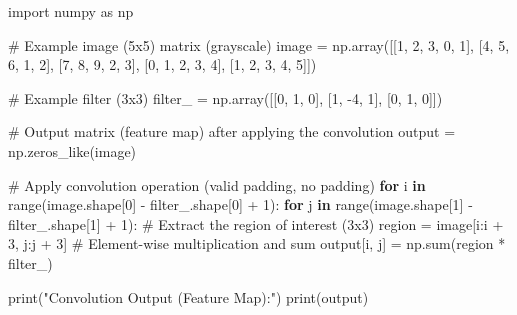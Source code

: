 \documentclass[
  letterpaper,
  DIV=11,
  numbers=noendperiod]{scrreprt}
\newenvironment{Shaded}{\begin{snugshade}}{\end{snugshade}}
\newcommand{\BuiltInTok}[1]{\textcolor[rgb]{0.00,0.23,0.31}{#1}}
\newcommand{\CommentTok}[1]{\textcolor[rgb]{0.37,0.37,0.37}{#1}}
\newcommand{\ControlFlowTok}[1]{\textcolor[rgb]{0.00,0.23,0.31}{\textbf{#1}}}
\newcommand{\DecValTok}[1]{\textcolor[rgb]{0.68,0.00,0.00}{#1}}
\newcommand{\ImportTok}[1]{\textcolor[rgb]{0.00,0.46,0.62}{#1}}
\newcommand{\KeywordTok}[1]{\textcolor[rgb]{0.00,0.23,0.31}{\textbf{#1}}}
\newcommand{\NormalTok}[1]{\textcolor[rgb]{0.00,0.23,0.31}{#1}}
\newcommand{\OperatorTok}[1]{\textcolor[rgb]{0.37,0.37,0.37}{#1}}
\newcommand{\StringTok}[1]{\textcolor[rgb]{0.13,0.47,0.30}{#1}}
\begin{document}
\begin{Shaded}
\begin{Highlighting}[]
\ImportTok{import}\NormalTok{ numpy }\ImportTok{as}\NormalTok{ np}

\CommentTok{\# Example image (5x5) matrix (grayscale)}
\NormalTok{image }\OperatorTok{=}\NormalTok{ np.array([[}\DecValTok{1}\NormalTok{, }\DecValTok{2}\NormalTok{, }\DecValTok{3}\NormalTok{, }\DecValTok{0}\NormalTok{, }\DecValTok{1}\NormalTok{],}
\NormalTok{                  [}\DecValTok{4}\NormalTok{, }\DecValTok{5}\NormalTok{, }\DecValTok{6}\NormalTok{, }\DecValTok{1}\NormalTok{, }\DecValTok{2}\NormalTok{],}
\NormalTok{                  [}\DecValTok{7}\NormalTok{, }\DecValTok{8}\NormalTok{, }\DecValTok{9}\NormalTok{, }\DecValTok{2}\NormalTok{, }\DecValTok{3}\NormalTok{],}
\NormalTok{                  [}\DecValTok{0}\NormalTok{, }\DecValTok{1}\NormalTok{, }\DecValTok{2}\NormalTok{, }\DecValTok{3}\NormalTok{, }\DecValTok{4}\NormalTok{],}
\NormalTok{                  [}\DecValTok{1}\NormalTok{, }\DecValTok{2}\NormalTok{, }\DecValTok{3}\NormalTok{, }\DecValTok{4}\NormalTok{, }\DecValTok{5}\NormalTok{]])}

\CommentTok{\# Example filter (3x3)}
\NormalTok{filter\_ }\OperatorTok{=}\NormalTok{ np.array([[}\DecValTok{0}\NormalTok{, }\DecValTok{1}\NormalTok{, }\DecValTok{0}\NormalTok{],}
\NormalTok{                    [}\DecValTok{1}\NormalTok{, }\OperatorTok{{-}}\DecValTok{4}\NormalTok{, }\DecValTok{1}\NormalTok{],}
\NormalTok{                    [}\DecValTok{0}\NormalTok{, }\DecValTok{1}\NormalTok{, }\DecValTok{0}\NormalTok{]])}

\CommentTok{\# Output matrix (feature map) after applying the convolution}
\NormalTok{output }\OperatorTok{=}\NormalTok{ np.zeros\_like(image)}

\CommentTok{\# Apply convolution operation (valid padding, no padding)}
\ControlFlowTok{for}\NormalTok{ i }\KeywordTok{in} \BuiltInTok{range}\NormalTok{(image.shape[}\DecValTok{0}\NormalTok{] }\OperatorTok{{-}}\NormalTok{ filter\_.shape[}\DecValTok{0}\NormalTok{] }\OperatorTok{+} \DecValTok{1}\NormalTok{):}
    \ControlFlowTok{for}\NormalTok{ j }\KeywordTok{in} \BuiltInTok{range}\NormalTok{(image.shape[}\DecValTok{1}\NormalTok{] }\OperatorTok{{-}}\NormalTok{ filter\_.shape[}\DecValTok{1}\NormalTok{] }\OperatorTok{+} \DecValTok{1}\NormalTok{):}
        \CommentTok{\# Extract the region of interest (3x3)}
\NormalTok{        region }\OperatorTok{=}\NormalTok{ image[i:i }\OperatorTok{+} \DecValTok{3}\NormalTok{, j:j }\OperatorTok{+} \DecValTok{3}\NormalTok{]}
        \CommentTok{\# Element{-}wise multiplication and sum}
\NormalTok{        output[i, j] }\OperatorTok{=}\NormalTok{ np.}\BuiltInTok{sum}\NormalTok{(region }\OperatorTok{*}\NormalTok{ filter\_)}

\BuiltInTok{print}\NormalTok{(}\StringTok{"Convolution Output (Feature Map):"}\NormalTok{)}
\BuiltInTok{print}\NormalTok{(output)}
\end{Highlighting}
\end{Shaded}
\end{document}
